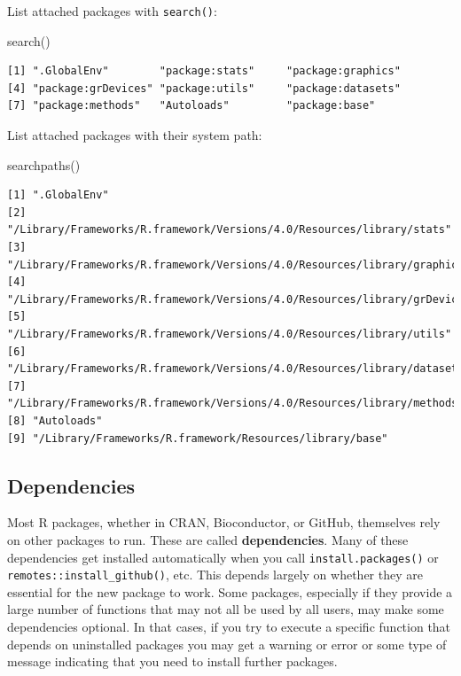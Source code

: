\documentclass[
]{book}
\newenvironment{Shaded}{\begin{snugshade}}{\end{snugshade}}
\newcommand{\FunctionTok}[1]{\textcolor[rgb]{0.00,0.00,0.00}{#1}}
\newcommand{\NormalTok}[1]{#1}
\begin{document}
List attached packages with \texttt{search()}:

\begin{Shaded}
\begin{Highlighting}[]
\FunctionTok{search}\NormalTok{()}
\end{Highlighting}
\end{Shaded}

\begin{verbatim}
[1] ".GlobalEnv"        "package:stats"     "package:graphics" 
[4] "package:grDevices" "package:utils"     "package:datasets" 
[7] "package:methods"   "Autoloads"         "package:base"     
\end{verbatim}

List attached packages with their system path:

\begin{Shaded}
\begin{Highlighting}[]
\FunctionTok{searchpaths}\NormalTok{()}
\end{Highlighting}
\end{Shaded}

\begin{verbatim}
[1] ".GlobalEnv"                                                              
[2] "/Library/Frameworks/R.framework/Versions/4.0/Resources/library/stats"    
[3] "/Library/Frameworks/R.framework/Versions/4.0/Resources/library/graphics" 
[4] "/Library/Frameworks/R.framework/Versions/4.0/Resources/library/grDevices"
[5] "/Library/Frameworks/R.framework/Versions/4.0/Resources/library/utils"    
[6] "/Library/Frameworks/R.framework/Versions/4.0/Resources/library/datasets" 
[7] "/Library/Frameworks/R.framework/Versions/4.0/Resources/library/methods"  
[8] "Autoloads"                                                               
[9] "/Library/Frameworks/R.framework/Resources/library/base"                  
\end{verbatim}

\hypertarget{dependencies}{%
\subsection{Dependencies}\label{dependencies}}

Most R packages, whether in CRAN, Bioconductor, or GitHub, themselves rely on other packages to run. These are called \textbf{dependencies}. Many of these dependencies get installed automatically when you call \texttt{install.packages()} or \texttt{remotes::install\_github()}, etc. This depends largely on whether they are essential for the new package to work. Some packages, especially if they provide a large number of functions that may not all be used by all users, may make some dependencies optional. In that cases, if you try to execute a specific function that depends on uninstalled packages you may get a warning or error or some type of message indicating that you need to install further packages.
\end{document}
